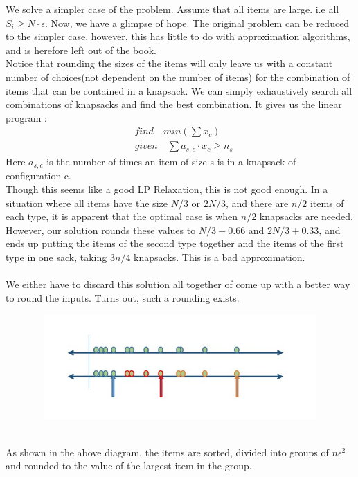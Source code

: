 \documentclass[12pt]{report}
\begin{document}
We solve a simpler case of the problem. Assume that all items are large. i.e all $S_i \geq N\cdot \epsilon$. Now, we have a glimpse of hope. The original problem can be reduced to the simpler case, however, this has little to do with approximation algorithms, and is herefore left out of the book.\\ 
Notice that rounding the sizes of the items will only leave us with a constant number of choices(not dependent on the number of items) for the combination of items that can be contained in a knapsack. We can simply exhaustively search all combinations of knapsacks and find the best combination. It gives us the linear program :
\begin{align*}
&find \quad min(\sum x_c) \\
&given \quad \sum a_{s,c} \cdot x_c \geq n_s
\end{align*}
Here $a_{s,c}$ is the number of times an item of size s is in a knapsack of configuration c.\\
Though this seems like a good LP Relaxation, this is not good enough. In a situation where all items have the size $N/3$ or $2N/3$, and there are $n/2$ items of each type, it is apparent that the optimal case is when $n/2$ knapsacks are needed. However, our solution rounds these values to $N/3+0.66$ and $2N/3 + 0.33$, and ends up putting the items of the second type together and the items of the first type in one sack, taking $3n/4$ knapsacks. This is a bad approximation.\\\\
We either have to discard this solution all together of come up with a better way to round the inputs. Turns out, such a rounding exists.
\begin{figure}[h]
\includegraphics[width=13cm, height=4cm]{binpac.jpg}
\centering
\end{figure}\\
As shown in the above diagram, the items are sorted, divided into groups of $n\epsilon^2$ and rounded to the value of the largest item in the group.\\\\\\\\\\
\end{document}
